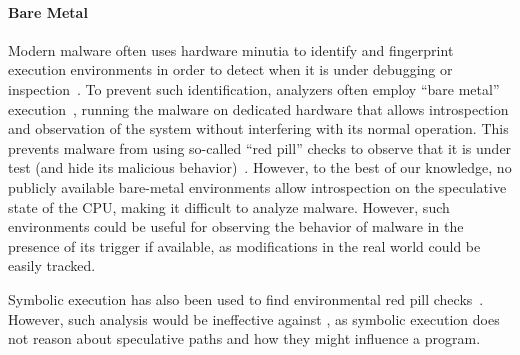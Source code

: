 \paragraph{Bare Metal}
Modern malware often uses hardware minutia to identify and fingerprint execution
environments in order to detect when it is under debugging or
inspection~\cite{lindorfer2011detecting,balzarotti2010efficient,paleari2009fistful}.
To prevent such identification, analyzers often employ ``bare metal''
execution~\cite{kirat2011barebox}, running the malware on dedicated hardware
that allows introspection and observation of the system without interfering with
its normal operation. This prevents malware from using so-called ``red pill''
checks to observe that it is under test (and hide its malicious
behavior)~\cite{kirat2014barecloud}. However, to the best of our knowledge, no
publicly available bare-metal environments allow introspection on the
speculative state of the CPU, making it difficult to analyze \speculake malware.
However, such environments could be useful for observing the behavior of
\speculake malware in the presence of its trigger if available, as modifications
in the real world could be easily tracked.


Symbolic execution has also been used to find
environmental red pill checks~\cite{schwartz2010all}. However, such analysis
would be ineffective against \speculake, as symbolic execution does not reason
about speculative paths and how they might influence a program.

%
%


